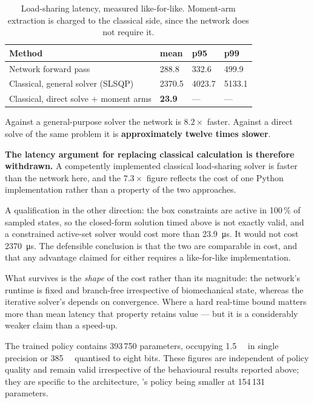 \begin{table}[H]
\centering
\caption{Load-sharing latency, measured like-for-like. Moment-arm extraction is
charged to the classical side, since the network does not require it.}
\begin{tabular}{@{} L{7.2cm} R{2.0cm} R{2.0cm} R{2.0cm} @{}}
\toprule
\textbf{Method} & \textbf{mean} & \textbf{p95} & \textbf{p99} \\
\midrule
Network forward pass & 288.8 & 332.6 & 499.9 \\
Classical, general solver (SLSQP) & 2370.5 & 4023.7 & 5133.1 \\
Classical, direct solve $+$ moment arms & \textbf{23.9} & --- & --- \\
\bottomrule
\end{tabular}
\label{tab:loadsharing_latency}
\end{table}

Against a general-purpose solver the network is $8.2\times$ faster. Against a
direct solve of the same problem it is \textbf{approximately twelve times
slower}.

\textbf{The latency argument for replacing classical calculation is therefore
withdrawn.} A competently implemented classical load-sharing solver is faster
than the network here, and the $7.3\times$ figure reflects the cost of one Python
implementation rather than a property of the two approaches.

A qualification in the other direction: the box constraints are active in
100\,\% of sampled states, so the closed-form solution timed above is not exactly
valid, and a constrained active-set solver would cost more than
\SI{23.9}{\micro\second}. It would not cost \SI{2370}{\micro\second}. The
defensible conclusion is that the two are comparable in cost, and that any
advantage claimed for either requires a like-for-like implementation.

What survives is the \emph{shape} of the cost rather than its magnitude: the
network's runtime is fixed and branch-free irrespective of biomechanical state,
whereas the iterative solver's depends on convergence. Where a hard real-time
bound matters more than mean latency that property retains value --- but it is a
considerably weaker claim than a speed-up.

The trained \SAC policy contains 393\,750 parameters, occupying
\SI{1.5}{\mega\byte} in single precision or \SI{385}{\kilo\byte} quantised to
eight bits. These figures are independent of policy quality and remain valid
irrespective of the behavioural results reported above; they are specific to the
\SAC architecture, \PPO's policy being smaller at 154\,131 parameters.
